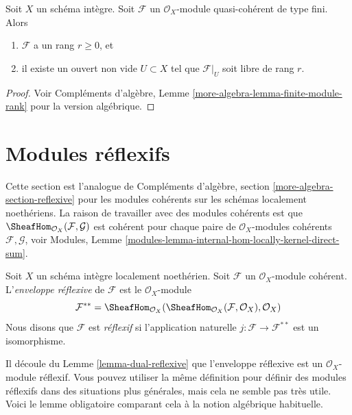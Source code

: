 \begin{lemma}
\label{lemma-finite-module-rank}
Soit  $X$  un schéma intègre. Soit  $\mathcal{F}$  un  $\mathcal{O}_X$-module
quasi-cohérent de type fini. Alors
\begin{enumerate}
\item $\mathcal{F}$  a un rang  $r \geq 0$, et
\item il existe un ouvert non vide  $U \subset X$  tel que  $\mathcal{F}|_U$  soit libre de rang
 $r$.
\end{enumerate}
\end{lemma}

\begin{proof}
Voir Compléments d'algèbre, Lemme  \ref{more-algebra-lemma-finite-module-rank}  pour la version algébrique.
\end{proof}











\section{Modules réflexifs}
\label{section-reflexive}

\noindent
Cette section est l'analogue de Compléments d'algèbre, section  \ref{more-algebra-section-reflexive}  pour les
modules cohérents sur les schémas localement noethériens. La raison de travailler
avec des modules cohérents est que  $\SheafHom_{\mathcal{O}_X}(\mathcal{F}, \mathcal{G})$  est cohérent pour chaque paire de
 $\mathcal{O}_X$-modules cohérents  $\mathcal{F}, \mathcal{G}$, voir Modules, Lemme  \ref{modules-lemma-internal-hom-locally-kernel-direct-sum}.

\begin{definition}
\label{definition-reflexive}
Soit  $X$  un schéma intègre localement noethérien. Soit  $\mathcal{F}$  un
 $\mathcal{O}_X$-module cohérent. L'{\it  enveloppe
réflexive}  de  $\mathcal{F}$  est le  $\mathcal{O}_X$-module
$$
\mathcal{F}^{**} = \SheafHom_{\mathcal{O}_X}(
\SheafHom_{\mathcal{O}_X}(\mathcal{F}, \mathcal{O}_X), \mathcal{O}_X)
$$
Nous disons que  $\mathcal{F}$  est  {\it  réflexif}  si
l'application naturelle  $j : \mathcal{F} \longrightarrow \mathcal{F}^{**}$  est un isomorphisme.
\end{definition}

\noindent
Il découle du Lemme  \ref{lemma-dual-reflexive}  que l'enveloppe réflexive est un
 $\mathcal{O}_X$-module réflexif. Vous pouvez utiliser la même définition pour définir
des modules réflexifs dans des situations plus générales, mais cela ne semble pas
très utile. Voici le lemme obligatoire comparant cela à la notion algébrique
habituelle.

